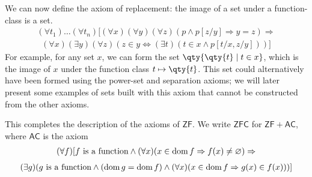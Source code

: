 \begin{enumerate}
    We can now define the axiom of replacement: the image of a set under a function-class is a set.
    \begin{align*}
        (\forall t_1)\dots(\forall t_n)[(\forall x)(\forall y)(\forall z)(p \wedge p[z/y] \Rightarrow y = z) \Rightarrow
    \end{align*}
    \begin{align*}
        (\forall x)(\exists y)(\forall z)(z \in y \Leftrightarrow (\exists t)(t \in x \wedge p[t/x,z/y]))]
    \end{align*}
    For example, for any set $x$, we can form the set $\qty{\qty{t} \mid t \in x}$, which is the image of $x$ under the function class $t \mapsto \qty{t}$.
    This set could alternatively have been formed using the power-set and separation axioms; we will later present some examples of sets built with this axiom that cannot be constructed from the other axioms.
\end{enumerate}
This completes the description of the axioms of $\mathsf{ZF}$.
We write $\mathsf{ZFC}$ for $\mathsf{ZF} + \mathsf{AC}$, where $\mathsf{AC}$ is the axiom
\begin{align*}
        (\forall f)[f\text{ is a function} \wedge (\forall x)(x \in \operatorname{dom} f \Rightarrow f(x) \neq \varnothing) \Rightarrow
    \end{align*}
\begin{align*}
        (\exists g)(g\text{ is a function} \wedge (\operatorname{dom} g = \operatorname{dom} f) \wedge (\forall x)(x \in \operatorname{dom} f \Rightarrow g(x) \in f(x)))]
    \end{align*}

